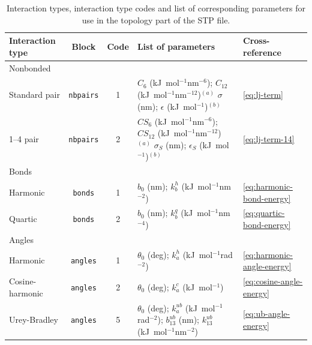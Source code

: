 \documentclass[10pt,a4paper,openany]{memoir}
\numberwithin{equation}{section}
\begin{document}
\begin{table}[tb]
  \centering
  \caption{Interaction types, interaction type codes and list of corresponding parameters for use in the topology part of the STP file.}
  \label{table:stp-types}
  \vspace{2ex}\par
  \begin{tabular}{lccp{49ex}l}
    \toprule
Interaction type & Block & Code & List of parameters & Cross-reference\\
\midrule
Nonbonded & &  &  & \\
\hspace{1ex} Standard pair & \texttt{nbpairs} &  1 & $C_6$ (kJ~mol$^{-1}$nm$^{-6}$); $C_{12}$ (kJ~mol$^{-1}$nm$^{-12}$)$^{(a)}$ \newline $\sigma$ (nm); $\epsilon$ (kJ~mol$^{-1}$)$^{(b)}$& \autoref{eq:lj-term}\\
\hspace{1ex} 1--4 pair & \texttt{nbpairs} &  2 & $CS_6$ (kJ~mol$^{-1}$nm$^{-6}$); $CS_{12}$ (kJ~mol$^{-1}$nm$^{-12}$)$^{(a)}$ \newline $\sigma_S$ (nm); $\epsilon_S$ (kJ~mol$^{-1}$)$^{(b)}$ & \autoref{eq:lj-term-14}\\
\hline
Bonds &  &  & \\
\hspace{1ex} Harmonic & \texttt{bonds} &  1 & \(b_0\) (nm); \(k_b^h\) (kJ~mol$^{-1}$nm$^{-2}$) & \autoref{eq:harmonic-bond-energy}\\
\hspace{1ex} Quartic & \texttt{bonds} &  2 & \(b_0\) (nm); \(k_b^q\) (kJ~mol$^{-1}$nm$^{-4}$) & \autoref{eq:quartic-bond-energy}\\
\hline
Angles & &  &  & \\
\hspace{1ex} Harmonic & \texttt{angles} &  1 & \(\theta_0\) (deg); \(k_a^h\) (kJ~mol$^{-1}$rad$^{-2}$) & \autoref{eq:harmonic-angle-energy}\\
\hspace{1ex} Cosine-harmonic & \texttt{angles} &  2 & \(\theta_0\) (deg); \(k_a^c\) (kJ~mol$^{-1}$) &\autoref{eq:cosine-angle-energy}\\
\hspace{1ex} Urey-Bradley & \texttt{angles} &  5 & \(\theta_0\) (deg); \(k_a^{ub}\) (kJ~mol$^{-1}$rad$^{-2}$); \newline \(b_{13}^{ub}\) (nm); \(k_{13}^{ub}\) (kJ~mol$^{-1}$nm$^{-2}$) & \autoref{eq:ub-angle-energy}\\
\hline

\end{tabular}
\end{table}
\end{document}
